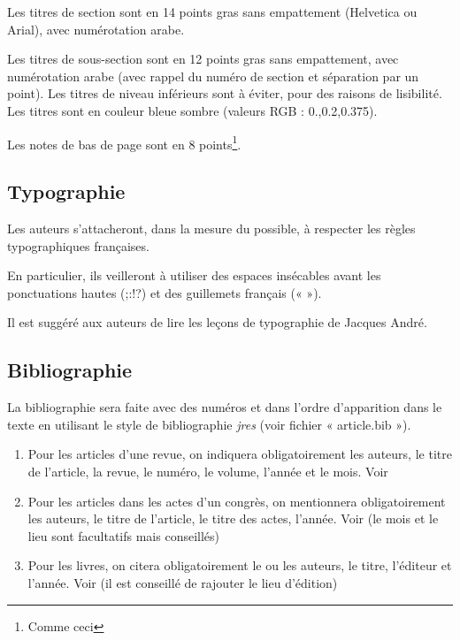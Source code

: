 \documentclass[city=Montpellier,year=2013]{jres}
\begin{document}
Les titres de section sont en 14 points gras sans empattement
(Helvetica ou Arial), avec numérotation arabe.

Les titres de sous-section sont en 12 points gras sans empattement,
avec numérotation arabe (avec rappel du numéro de section et
séparation par un point).
Les titres de niveau inférieurs sont à éviter, pour des raisons de
lisibilité.
Les titres sont en couleur bleue sombre (valeurs RGB : 0.,0.2,0.375).  

Les notes de bas de page sont en 8 points\footnote{Comme ceci}.

\subsection{Typographie}

Les auteurs s'attacheront, dans la mesure du possible, à respecter les
règles typographiques françaises.

En particulier, ils veilleront à utiliser des espaces insécables avant
les ponctuations hautes (;:!?) et des guillemets français (« »).

Il est suggéré aux auteurs de lire les leçons de
typographie \cite{andre1990} de Jacques André.

\subsection{Bibliographie}

La bibliographie sera faite avec des numéros et dans l'ordre
d'apparition dans le texte en utilisant le style de bibliographie
\emph{jres} (voir fichier « article.bib »).

\begin{enumerate}

    \item Pour les articles d'une revue, on indiquera obligatoirement les
      auteurs, le titre de l'article, la revue, le numéro, le volume,
      l'année et le mois. Voir \cite{exemple1}

    \item Pour les articles dans les actes d'un congrès, on mentionnera
      obligatoirement les auteurs, le titre de l'article, le titre des
      actes, l'année. Voir \cite{exemple2} (le mois et le lieu sont
      facultatifs mais conseillés)

    \item Pour les livres, on citera obligatoirement le ou les auteurs, le
      titre, l'éditeur et l'année. Voir \cite{exemple3} (il est conseillé de
      rajouter le lieu d'édition)

\end{enumerate}
\end{document}
